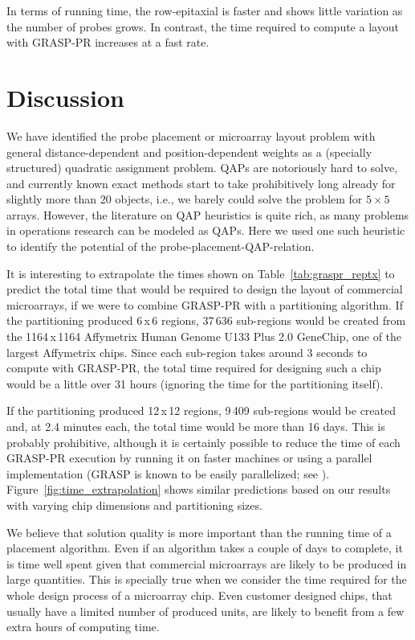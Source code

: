 \documentclass{bioinfo}
\begin{document}
In terms of running time, the row-epitaxial is faster and shows little variation as the number of probes grows. In contrast, the time required to compute a layout with GRASP-PR increases at a fast rate.


\section{Discussion}
\label{sec:discussion}

We have identified the probe placement or microarray layout problem with
general distance-dependent and position-dependent weights as a (specially
structured) quadratic assignment problem. QAPs are notoriously hard to solve,
and currently known exact methods start to take prohibitively long already for
slightly more than $20$ objects, i.e., we barely could solve the problem for
$5\times 5$ arrays. However, the literature on QAP heuristics is quite rich,
as many problems in operations research can be modeled as QAPs. Here we used
one such heuristic to identify the potential of the
probe-placement-QAP-relation.

It is interesting to extrapolate the times shown on Table~\ref{tab:graspr_reptx} to predict the total time that would be required to design the layout of commercial microarrays, if we were to combine GRASP-PR with a partitioning algorithm. If the partitioning produced 6\,x\,6 regions, 37\,636 sub-regions would be created from the 1164\,x\,1164 Affymetrix Human Genome U133 Plus 2.0 GeneChip\raisebox{.6ex}{\scriptsize \textregistered}, one of the largest Affymetrix chips. Since each sub-region takes around 3 seconds to compute with GRASP-PR, the total time required for designing such a chip would be a little over 31 hours (ignoring the time for the partitioning itself).

If the partitioning produced 12\,x\,12 regions, 9\,409 sub-regions would be created and, at 2.4 minutes each, the total time would be more than 16 days. This is probably prohibitive, although it is certainly possible to reduce the time of each GRASP-PR execution by running it on faster machines or using a parallel implementation (GRASP is known to be easily parallelized; see \citealp{LI94}). Figure~\ref{fig:time_extrapolation} shows similar predictions based on our results with varying chip dimensions and partitioning sizes.

We believe that solution quality is more important than the running time of a placement algorithm. Even if an algorithm takes a couple of days to complete, it is time well spent given that commercial microarrays are likely to be produced in large quantities. This is specially true when we consider the time required for the whole design process of a microarray chip. Even customer designed chips, that usually have a limited number of produced units, are likely to benefit from a few extra hours of computing time.
\end{document}
